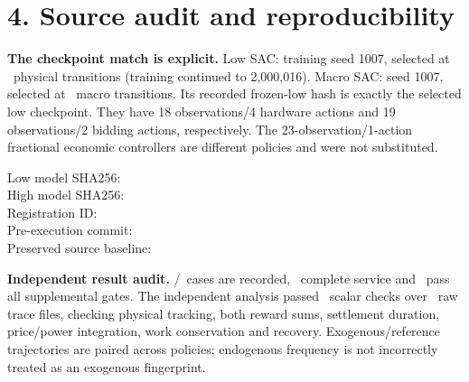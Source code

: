 \documentclass[10pt]{article}
\begin{document}
\newpage
\section*{4. Source audit and reproducibility}
\textbf{The checkpoint match is explicit.}
Low SAC: training seed 1007, selected at \LowSelectedSteps\ physical
transitions (training continued to 2,000,016).
Macro SAC: seed 1007, selected at \HighSelectedSteps\ macro transitions.
Its recorded frozen-low hash is exactly the selected low checkpoint.
They have 18 observations/4 hardware actions and 19 observations/2 bidding
actions, respectively. The 23-observation/1-action fractional economic
controllers are different policies and were not substituted.

\begin{small}
Low model SHA256: \texttt{\LowModelHash}\\
High model SHA256: \texttt{\HighModelHash}\\
Registration ID: \texttt{\RegistrationID}\\
Pre-execution commit: \texttt{\RegistrationCommit}\\
Preserved source baseline: \texttt{\BaselineCommit}
\end{small}

\textbf{Independent result audit.}
\RegisteredCases/\RegisteredCases\ cases are recorded,
\CompletedCases\ complete service and \QualifiedCases\ pass all supplemental
gates. The independent analysis passed \RawChecks\ scalar checks over
\RawTraceFiles\ raw trace files, checking physical tracking, both reward sums,
settlement duration, price/power integration, work conservation and recovery.
Exogenous/reference trajectories are paired across policies; endogenous
frequency is not incorrectly treated as an exogenous fingerprint.
\end{document}
